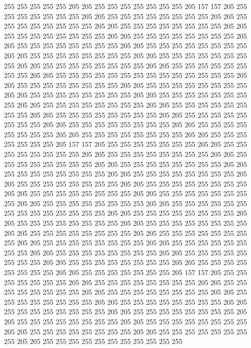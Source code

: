 255 255 255 255 255 205 205 255 255 255 255 255 255 255 205 157 157 205 255 255
255 255 255 255 255 205 205 255 255 255 255 255 255 255 255 205 205 255 255 255
255 255 255 255 255 205 205 255 255 255 255 255 255 255 255 205 205 255 255 255
255 255 255 255 255 205 205 255 255 255 255 255 255 255 255 205 205 255 255 255
255 255 255 255 255 205 205 255 255 255 255 255 255 255 255 205 205 255 255 255
255 255 255 255 255 205 205 255 255 255 255 255 255 255 255 205 205 255 255 255
255 255 255 255 255 205 205 255 255 255 255 255 255 255 255 205 205 255 255 255
255 255 255 255 255 255 255 255 255 255 255 205 205 255 255 255 255 255 255 255
255 205 205 255 255 255 255 255 255 255 255 205 205 255 255 255 255 255 255 255
255 205 205 255 255 255 255 255 255 255 255 205 205 255 255 255 255 255 255 255
255 205 205 255 255 255 255 255 255 255 255 205 205 255 255 255 255 255 255 255
255 205 205 255 255 255 255 255 255 255 255 205 205 255 255 255 255 255 255 255
255 205 205 255 255 255 255 255 255 255 255 205 205 255 255 255 255 255 255 255
255 205 205 255 255 255 255 255 255 255 205 157 157 205 255 255 255 255 255 255
255 205 205 255 255 255 255 255 255 255 255 205 205 255 255 255 255 255 255 255
255 205 205 255 255 255 255 255 255 255 255 205 205 255 255 255 255 255 255 255
255 205 205 255 255 255 255 255 255 255 255 205 205 255 255 255 255 255 255 255
255 205 205 255 255 255 255 255 255 255 255 205 205 255 255 255 255 255 255 255
255 205 205 255 255 255 255 255 255 255 255 205 205 255 255 255 255 255 255 255
255 205 205 255 255 255 255 255 255 255 255 205 205 255 255 255 255 255 255 255
255 255 255 255 255 255 255 205 205 255 255 255 255 255 255 255 255 205 205 255
255 255 255 255 255 255 255 205 205 255 255 255 255 255 255 255 255 205 205 255
255 255 255 255 255 255 255 205 205 255 255 255 255 255 255 255 255 205 205 255
255 255 255 255 255 255 255 205 205 255 255 255 255 255 255 255 255 205 205 255
255 255 255 255 255 255 255 205 205 255 255 255 255 255 255 255 255 205 205 255
255 255 255 255 255 255 255 205 205 255 255 255 255 255 255 255 255 205 205 255
255 255 255 255 255 255 205 157 157 205 255 255 255 255 255 255 255 205 205 255
255 255 255 255 255 255 255 205 205 255 255 255 255 255 255 255 255 205 205 255
255 255 255 255 255 255 255 205 205 255 255 255 255 255 255 255 255 205 205 255
255 255 255 255 255 255 255 205 205 255 255 255 255 255 255 255 255 205 205 255
255 255 255 255 255 255 255 205 205 255 255 255 255 255 255 255 255 205 205 255
255 255 255 255 255 255 255 205 205 255 255 255 255 255 255 255 255 205 205 255
255 255 255 255 255 255 255 205 205 255 255 255 255 255 255 255 255 255 255 255
